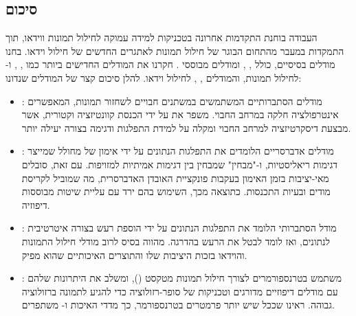 \begin{hebrew}
\begin{RTL}

\section*{סיכום} %


העבודה בוחנת התקדמות אחרונה בטכניקות למידה עמוקה לחילול תמונות ווידאו,  
תוך התמקדות במעבר מהתחום הבוגר של חילול תמונות לאתגרים החדשים של חילול וידאו.  
בחנו מודלים בסיסיים, כולל , , ומודלים מבוססי .  
חקרנו את המודלים החדישים ביותר כמו , , ו- לחילול תמונות, והמודלים
, ,  לחילול וידאו.  
להלן סיכום קצר של המודלים שנדונו:




\begin{itemize}
    \item \textbf{}: מודלים הסתברותיים המשתמשים במשתנים חבויים לשחזור תמונות, 
    המאפשרים אינטרפולציה חלקה במרחב החבוי. 
     משפר את  על ידי הכנסת קוונטיזציה וקטורית, 
    אשר מבצעת דיסקרטיזציה למרחב החבוי ומקלה על למידת התפלגות ודגימה בצורה יעילה יותר.

    \item \textbf{}: מודלים אדברסריים הלומדים את התפלגות הנתונים על ידי אימון של מחולל שמייצר דגימות ריאליסטיות, 
    ו-"מבחין" שמבחין בין דגימות אמיתיות למזויפות. עם זאת,  סובלים מאי-יציבות בזמן האימון בעקבות פונקציית האובדן האדברסרית,
    מה שמוביל לקריסת מודים ובעיות התכנסות. כתוצאה מכך, השימוש בהם ירד עם עליית שיטות מבוססות דיפוזיה.

    \item \textbf{}: מודל הסתברותי הלומד את התפלגות הנתונים על ידי הוספת רעש בצורה איטרטיבית לנתונים, 
    ואז לומד לבטל את הרעש בהדרגה.  מהווה בסיס לרוב מודלי חילול התמונות והוידאו בזכות היציבות 
    שלו והתוצרים האיכותיים שהוא מפיק.

    \item \textbf{}:  משתמש בטרנספורמרים לצורך חילול תמונות מטקסט (), ומשלב את היתרונות שלהם 
    עם מודלים דיפוזיים מדורגים וטכניקות של סופר-רזולוציה כדי להגיע לתמונה ברזולוציה גבוהה.
    ראינו שככל שיש יותר פרמטרים בטרנספורמר, כך מדדי האיכות  ו- משתפרים.
\end{itemize}








\end{RTL}
\end{hebrew}
